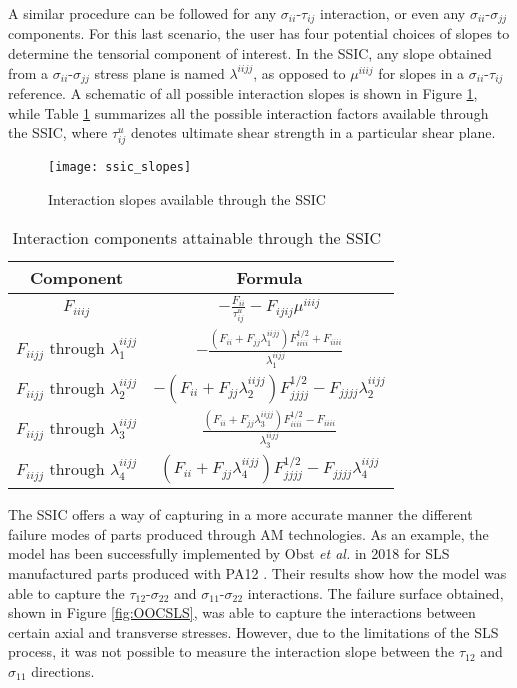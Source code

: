 \documentclass[main.tex]{subfiles}
\begin{document}
A similar procedure can be followed for any $\sigma_{ii}$-$\tau_{ij}$ interaction, or even any $\sigma_{ii}$-$\sigma_{jj}$ components. For this last scenario, the user has four potential choices of slopes to determine the tensorial component of interest. In the SSIC, any slope obtained from a $\sigma_{ii}$-$\sigma_{jj}$ stress plane is named $\lambda^{iijj}$, as opposed to $\mu^{iiij}$ for slopes in a $\sigma_{ii}$-$\tau_{ij}$ reference. A schematic of all possible interaction slopes is shown in Figure \ref{fig:SSICdemo}, while Table \ref{tab:OOCcomp} summarizes all the possible interaction factors available through the SSIC, where $\tau_{ij}^u$ denotes ultimate shear strength in a particular shear plane. 

\pagebreak
\begin{figure}[h]
	\center
	\texttt{[image: ssic\_slopes]}
	\caption{Interaction slopes available through the SSIC} \label{fig:SSICdemo}
\end{figure}
\begin{table}[!htbp] %
	\renewcommand{\arraystretch}{1.5}
	\centering
	\caption{Interaction components attainable through the SSIC~\cite{Osswald2017a}}
	\begin{tabular}{ c c } 
		\toprule
		\textbf{Component} & \textbf{Formula} \\
		\midrule
		$F_{iiij}$ & $-\frac{F_{ii}}{\tau_{ij}^u}-F_{ijij}\mu^{iiij}$\\
		$F_{iijj}$ through $\lambda^{iijj}_1$ & $-\frac{(F_{ii}+F_{jj}\lambda^{iijj}_1)F_{iiii}^{1/2}+F_{iiii}}{\lambda^{iijj}_1}$\\
		$F_{iijj}$ through $\lambda^{iijj}_2$ & $-(F_{ii}+F_{jj}\lambda^{iijj}_2)F_{jjjj}^{1/2}-F_{jjjj}\lambda^{iijj}_2$\\
		$F_{iijj}$ through $\lambda^{iijj}_3$ & $\frac{(F_{ii}+F_{jj}\lambda^{iijj}_3)F_{iiii}^{1/2}-F_{iiii}}{\lambda^{iijj}_3}$\\
		$F_{iijj}$ through $\lambda^{iijj}_4$ & $(F_{ii}+F_{jj}\lambda^{iijj}_4)F_{jjjj}^{1/2}-F_{jjjj}\lambda^{iijj}_4$\\
		\bottomrule
	\end{tabular}
	\label{tab:OOCcomp}
\end{table}


The SSIC offers a way of capturing in a more accurate manner the different failure modes of parts produced through AM technologies. As an example, the model has been successfully implemented by Obst \emph{et al.} in 2018 for SLS manufactured parts produced with PA12 \cite{Obst2018, Obst2017}. Their results show how the model was able to capture the $\tau_{12}$-$\sigma_{22}$ and $\sigma_{11}$-$\sigma_{22}$ interactions. The failure surface obtained, shown in Figure \ref{fig:OOCSLS}, was able to capture the interactions between certain axial and transverse stresses. However, due to the limitations of the SLS process, it was not possible to measure the interaction slope between the $\tau_{12}$ and $\sigma_{11}$ directions.
\end{document}
